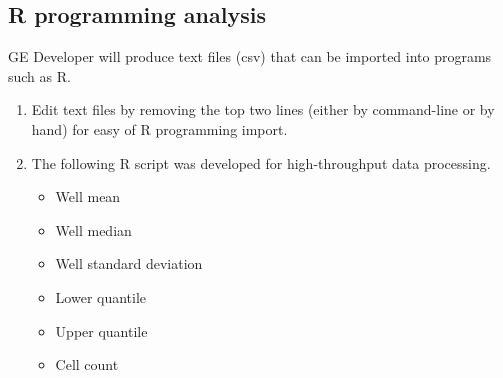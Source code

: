 \subsection{R programming analysis}

\noindent GE Developer will produce text files (csv) that can be imported into programs such as R\footnotemark. 

\begin{enumerate}
\item Edit text files by removing the top two lines (either by command-line or by hand) for easy of R programming import.
  \begin{figure}[!ht]
    \centering
  \end{figure}
  \pagebreak
\item The following R script was developed for high-throughput data processing.
  \begin{itemize}
  \item Well mean
  \item Well median
  \item Well standard deviation
  \item Lower quantile
  \item Upper quantile
  \item Cell count
  \end{itemize}
  \pagebreak
  \begin{figure}[!ht]
    \centering
    \resizebox{\linewidth}{7in}{
}
\end{figure}
\end{enumerate}

